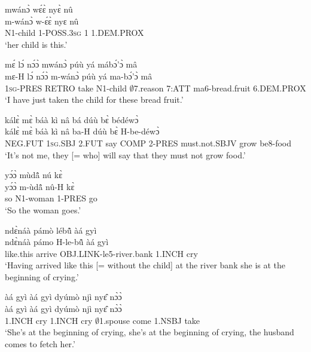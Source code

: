 \begin{exe} 
\exN\label{87}
  \glll mwánɔ̀ wɛ́ɛ̀ nyɛ̀ nû \\
        m-wánɔ̀ w-ɛ́ɛ̀ nyɛ nû \\
        N1-child 1-POSS.3\textsc{sg} 1 1.DEM.PROX \\
    \trans `her child is this.'
\end{exe}

\begin{exe} 
\exN\label{88}
  \glll mɛ́ lɔ́ nɔ́ɔ̀ mwánɔ̀ púù yá mábɔ́'ɔ̀ mâ\\
        mɛ-H lɔ́ nɔ́ɔ̀ m-wánɔ̀ púù yá ma-bɔ́'ɔ̀ mâ\\
        1\textsc{sg}-PRES RETRO take N1-child $\emptyset$7.reason 7:ATT ma6-bread.fruit 6.DEM.PROX\\
    \trans `I have just taken the child for these bread fruit.'
\end{exe}

\begin{exe} 
\exN\label{89}
  \glll kálɛ̀ mɛ̀ báà kì nâ bá dúù bɛ̀ bédéwɔ̀\\
         kálɛ̀ mɛ̀ báà kì nâ ba-H dúù bɛ̀ H-be-déwɔ̀\\
       NEG.FUT 1\textsc{sg}.SBJ  2.FUT say COMP 2-PRES must.not.SBJV grow be8-food\\
    \trans `It's not me, they [= who] will say that they must not grow food.'
\end{exe}

\begin{exe} 
\exN\label{90}
  \glll yɔ́ɔ̀ mùdã̂ nú kɛ̀ \\
        yɔ́ɔ̀ m-ùdã̂ nû-H kɛ̀ \\
      so N1-woman 1-PRES go \\
    \trans `So the woman goes.'
\end{exe}

\begin{exe} 
\exN\label{91}
  \glll  ndɛ̀náà pámò lébũ̂ àá gyì \\
         ndɛ̀náà pámo H-le-bũ̂ àá gyì \\
        like.this arrive OBJ.LINK-le5-river.bank 1.INCH cry \\
    \trans `Having arrived like this [= without the child] at the river bank she is at the beginning of crying.'
\end{exe}

\begin{exe} 
\exN\label{92}
  \glll àá gyì àá gyì dyúmò njì nyɛ̂ nɔ̀ɔ̀ \\
       àá gyì àá gyì dyúmò njì nyɛ̂ nɔ̀ɔ̀ \\
       1.INCH cry 1.INCH cry $\emptyset$1.spouse come 1.NSBJ take  \\
    \trans `She's at the beginning of crying, she's at the beginning of crying, the husband comes to fetch her.'
\end{exe}

